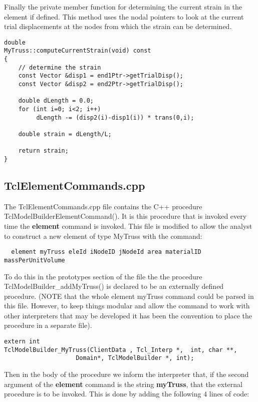 \documentclass[12pt]{article}
\begin{document}
Finally the private member function for determining the current strain
in the element if defined. This method uses the nodal pointers to look
at the current trial displacements at the nodes from which the strain
can be determined. 

{\sf\small
\begin{verbatim}
double
MyTruss::computeCurrentStrain(void) const
{
    // determine the strain
    const Vector &disp1 = end1Ptr->getTrialDisp();
    const Vector &disp2 = end2Ptr->getTrialDisp();	

    double dLength = 0.0;
    for (int i=0; i<2; i++)
         dLength -= (disp2(i)-disp1(i)) * trans(0,i);
    
    double strain = dLength/L;

    return strain;
}
\end{verbatim} }

\subsection {\sf TclElementCommands.cpp}
The TclElementCommands.cpp file contains the C++ procedure 
TclModelBuilderElementCommand(). It is this procedure that is invoked every 
time the {\bf element} command is invoked. This file is modified to allow 
the analyst to construct a new element of type MyTruss with the command:
{\sf \begin{verbatim}
  element myTruss eleId iNodeID jNodeId area materialID massPerUnitVolume
\end{verbatim} } 
\noindent To do this in the prototypes section of the file the
the procedure TclModelBuilder\_addMyTruss() is declared to be an externally defined 
procedure. (NOTE that the whole element myTruss command could be parsed in this file. 
However, to keep things modular and allow the command to work with other interpreters 
that may be developed it has been the convention to place the
procedure in a separate file).    

{\sf \begin{verbatim}
extern int
TclModelBuilder_MyTruss(ClientData , Tcl_Interp *,  int, char **,
	                Domain*, TclModelBuilder *, int);
\end{verbatim} } 

Then in the body of the procedure we inform the interpreter that, if the second argument
of the {\bf element} command is the string {\bf myTruss}, that the
external procedure is to be invoked. This is done by adding the
following 4 lines of code: 
\end{document}
